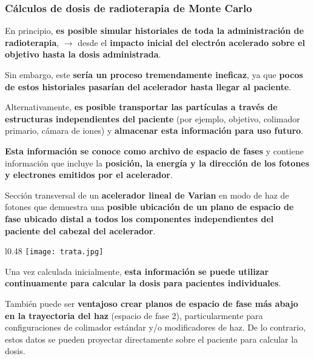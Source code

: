 \documentclass[aspectratio=169,xcolor=dvipsnames,t]{beamer}
\begin{document}
\begin{frame}

    \frametitle{Cálculos de dosis de radioterapia de Monte Carlo}

    En principio, \textbf{es posible simular historiales de toda la administración de radioterapia}, $\rightarrow$ desde el \textbf{impacto inicial del electrón acelerado sobre el objetivo hasta la dosis administrada}. 
    
    Sin embargo, este \textbf{sería un proceso tremendamente ineficaz}, ya que \textbf{pocos de estos historiales pasarían del acelerador hasta llegar al paciente}. 

    Alternativamente, \textbf{es posible transportar las partículas a través de estructuras independientes del paciente} (por ejemplo, objetivo, colimador primario, cámara de iones) y \textbf{almacenar esta información para uso futuro}. 

    \textbf{Esta información se conoce como archivo de espacio de fases} y contiene información que incluye la \textbf{posición, la energía y la dirección de los fotones y electrones emitidos por el acelerador}.

\end{frame}

\begin{frame}

    Sección transversal de un \textbf{acelerador lineal de Varian} en modo de haz de fotones que demuestra una \textbf{posible ubicación de un plano de espacio de fase ubicado distal a todos los componentes independientes del paciente del cabezal del acelerador}.

    \begin{wrapfigure}{l}{0.48\textwidth}
        \centering
        \texttt{[image: trata.jpg]}
    \end{wrapfigure}
    
    Una vez calculada inicialmente, \textbf{esta información se puede utilizar continuamente para calcular la dosis para pacientes individuales}.
    
    También puede ser \textbf{ventajoso crear planos de espacio de fase más abajo en la trayectoria del haz} (espacio de fase 2), particularmente para configuraciones de colimador estándar y/o modificadores de haz. De lo contrario, estos datos se pueden proyectar directamente sobre el paciente para calcular la dosis.

\end{frame}
\end{document}
